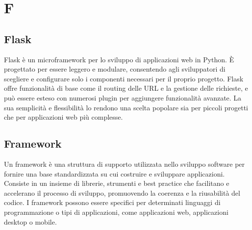\section{F}

\vspace{2em}
\subsection*{Flask}
Flask è un microframework per lo sviluppo di applicazioni web in Python. È progettato per essere leggero e modulare, consentendo agli sviluppatori di scegliere e configurare solo i componenti necessari per il proprio progetto. Flask offre funzionalità di base come il routing delle URL e la gestione delle richieste, e può essere esteso con numerosi plugin per aggiungere funzionalità avanzate. La sua semplicità e flessibilità lo rendono una scelta popolare sia per piccoli progetti che per applicazioni web più complesse.


\vspace{2em}
\subsection*{Framework}
Un framework è una struttura di supporto utilizzata nello sviluppo software per fornire una base standardizzata su cui costruire e sviluppare applicazioni. Consiste in un insieme di librerie, strumenti e best practice che facilitano e accelerano il processo di sviluppo, promuovendo la coerenza e la riusabilità del codice. I framework possono essere specifici per determinati linguaggi di programmazione o tipi di applicazioni, come applicazioni web, applicazioni desktop o mobile.
